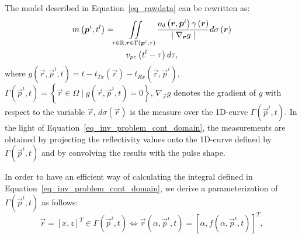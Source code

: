 \documentclass[conference]{IEEEtran}
\begin{document}
The model described in Equation~\eqref{eq_rawdata} can be rewritten as:
\begin{multline}
\label{eq_inv_problem_cont_domain}
m\left(\bm{p}^i, t^l\right) = \iint \limits_{ \tau \in \mathbb{R}, \bm{r} \in \Gamma\left(\bm{p}^i, \tau\right)} \frac{o_d\left(\bm{r}, \bm{p}^i\right)\gamma \left(\bm{r}\right)}{\mid \nabla_{\bm{r}} g \mid} d \sigma \left(\bm{r}\right) \\ v_{pe} \left(t^l - \tau\right) d \tau, 
\end{multline}
where $g\left(\vec{r}, \vec{p}^i, t\right) = t - t_{Tx} \left(\vec{r}\right) - t_{Rx} \left(\vec{r}, \vec{p}^i\right)$, $\Gamma \left(\vec{p}^i, t \right) = \left\lbrace \vec{r} \in \Omega \; | \; g\left(\vec{r}, \vec{p}^i, t \right) = 0 \right\rbrace$, $\nabla_{\vec{r}} g$ denotes the gradient of $g$ with respect to the variable $\vec{r}$, $d\sigma \left(\vec{r}\right)$ is the measure over the 1D-curve $\Gamma \left(\vec{p}^i, t \right)$. In the light of Equation~\eqref{eq_inv_problem_cont_domain}, the measurements are obtained by projecting the reflectivity values onto the 1D-curve defined by $\Gamma \left(\vec{p}^i, t \right)$ and by convolving the results with the pulse shape.

In order to have an efficient way of calculating the integral defined in Equation~\eqref{eq_inv_problem_cont_domain}, we derive a parameterization of $\Gamma \left(\vec{p}^i, t \right)$ as follows:
\begin{equation}
\label{eq_param_equation_generic}
\vec{r} = \left[x, z\right]^T \in \Gamma \left(\vec{p}^i, t \right) \Leftrightarrow \vec{r}\left(\alpha, \vec{p}^i, t\right)= \left[\alpha, f\left(\alpha, \vec{p}^i, t \right)\right]^T,
\end{equation}
\end{document}
